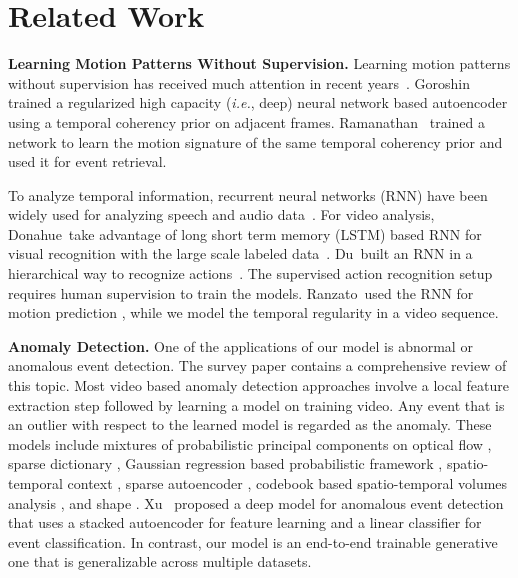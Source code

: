\documentclass[10pt,twocolumn,letterpaper]{article}
\begin{document}
 

\section{Related Work}
\label{sec:related}

\noindent
{\bf Learning Motion Patterns Without Supervision.}
Learning motion patterns without supervision has received much attention in recent years~\cite{leZYN11,jhuangSWP07,taylorFLB10}.
Goroshin\etal~\cite{goroshinBTEC15} trained a regularized high capacity (\emph{i.e.}, deep) neural network based autoencoder using a temporal coherency prior on adjacent frames. 
Ramanathan\etal~\cite{ramanathanTMF15} trained a network to learn the motion signature of the same temporal coherency prior and used it for event retrieval.

To analyze temporal information, recurrent neural networks (RNN) have been widely used for analyzing speech and audio data~\cite{graves2013speech}. 
For video analysis, Donahue\etal~take advantage of long short term memory (LSTM) based RNN for visual recognition with the large scale labeled data~\cite{donahue2014long}. 
Du\etal~built an RNN in a hierarchical way to recognize actions~\cite{du2015hierarchical}. 
The supervised action recognition setup requires human supervision to train the models. Ranzato\etal~used the RNN for motion prediction \cite{ranzatoSBMCC14}, while we model the temporal regularity in a video sequence.

\vspace{.5em} \noindent
{\bf Anomaly Detection.}
One of the applications of our model is abnormal or anomalous event detection.
The survey paper \cite{popoola2012video} contains a comprehensive review of this topic. 
Most video based anomaly detection approaches involve a local feature extraction step followed by learning a model on training video. 
Any event that is an outlier with respect to the learned model is regarded as the anomaly. 
These models include mixtures of probabilistic principal components on optical flow \cite{kim2009observe}, sparse dictionary \cite{zhao2011online,lu2013abnormal}, Gaussian regression based probabilistic framework \cite{cheng2015video}, spatio-temporal context \cite{xiao2015learning, zhu2013contextj}, sparse autoencoder \cite{sabokrou2015real}, codebook based spatio-temporal volumes analysis \cite{roshtkhari2013online}, and shape \cite{vaswani2005shape}.
Xu\etal~\cite{xu2015learning} proposed a deep model for anomalous event detection that uses a stacked autoencoder for feature learning and a linear classifier for event classification. 
In contrast, our model is an end-to-end trainable generative one that is generalizable across multiple datasets.
\end{document}
